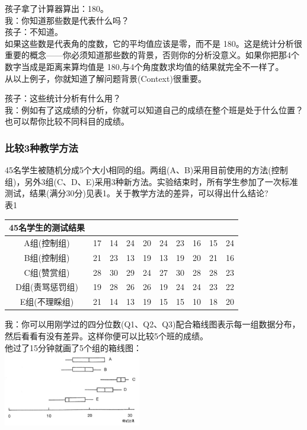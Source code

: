 孩子拿了计算器算出：180。\\
我：你知道那些数是代表什么吗？\\
孩子：不知道。\\
如果这些数是代表角的度数，它的平均值应该是零，而不是
180。这是统计分析很重要的概念------你必须知道那些数的背景，否则你的分析没意义。如果你把那4个数字当成是距离来算均值是
180,与4个角度数求均值的结果就完全不一样了。\\
从以上例子，你就知道了解问题背景(Context)很重要。

孩子：这些统计分析有什么用？\\
我：例如有了这成绩的分析，你就可以知道自己的成绩在整个班是处于什么位置？也可以帮你比较不同科目的成绩。

\hypertarget{ux6bd4ux8f83ux4e09ux79cdux6559ux5b66ux65b9ux6cd5}{%
\subsubsection{比较3种教学方法}\label{ux6bd4ux8f83ux4e09ux79cdux6559ux5b66ux65b9ux6cd5}}

45名学生被随机分成5个大小相同的组。两组(A、B)采用目前使用的方法(控制组)，另外3组(C、D、E)采用3种新方法。实验结束时，所有学生参加了一次标准测试，结果(满分30分)见表1。关于教学方法的差异，可以得出什么结论?\\
表1


\begin{tabular}{|c|c|c|c|c|c|c|c|c|c|}
\hline
\multirow{10}{*}{45名学生的测试结果 }\\
\hline
A组(控制组)&17&14&24&20&24&23&16&15&24\\
\hline
B组(控制组)&21&23&13&19&13&19&20&21&16 \\
\hline
C组(赞赏组)&28&30&29&24&27&30&28&28&23\\
\hline
D组(责骂惩罚组)&19&28&26&26&19&24&24&23&22\\
\hline
E组(不理睬组)&21&14&13&19&15&15&10&18&20\\
\hline
\end{tabular}

我：你可以用刚学过的四分位数(Q1、Q2、Q3)配合箱线图表示每一组数据分布，然后看看有没有差异。这样你便可以比较5个班的成绩。\\
他过了15分钟就画了5个组的箱线图：\\

\includegraphics[width=6cm]{图片61-31.jpg}

